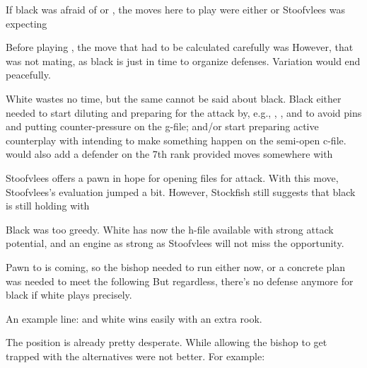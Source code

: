 If black was afraid of  or , the moves here to
play were either  or  Stoofvlees was
expecting 

Before playing , the move that had to be calculated carefully was
 However, that was not mating, as black is just in time to
organize defenses. Variation  would end peacefully.


White wastes no time, but the same cannot be said about black. Black
either needed to start diluting and preparing for the attack by,
e.g., , , and  to avoid pins and
putting counter-pressure on the g-file; and/or start preparing active
counterplay with  intending to make something happen on the
semi-open c-file.  would also add a defender on the 7th
rank provided  moves somewhere with 


Stoofvlees offers a pawn in hope for opening files for attack. With
this move, Stoofvlees's evaluation jumped a bit. However, Stockfish
still suggests that black is still holding with 


Black was too greedy. White has now the h-file available with strong
attack potential, and an engine as strong as Stoofvlees will not miss
the opportunity.


Pawn to  is coming, so the bishop needed to run either now,
or a concrete plan was needed to meet the following  But
regardless, there's no defense anymore for black if white plays
precisely.

An example line:  and white wins
easily with an extra rook.


The position is already pretty desperate. While allowing the bishop to
get trapped with  the alternatives were not better. For
example:

